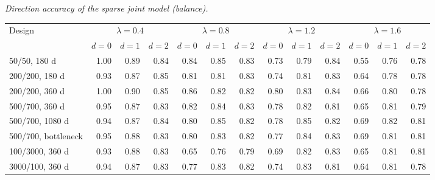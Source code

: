 \noindent\textit{Direction accuracy of the sparse joint model (balance).}
\begin{center}
\footnotesize
\setlength{\tabcolsep}{3pt}
\begin{tabular}{l*{12}{r}}
\toprule
Design & \multicolumn{3}{c}{$\lambda=0.4$} & \multicolumn{3}{c}{$\lambda=0.8$} & \multicolumn{3}{c}{$\lambda=1.2$} & \multicolumn{3}{c}{$\lambda=1.6$} \\
\cmidrule(lr){2-4}\cmidrule(lr){5-7}\cmidrule(lr){8-10}\cmidrule(lr){11-13}
 & $d=0$ & $d=1$ & $d=2$ & $d=0$ & $d=1$ & $d=2$ & $d=0$ & $d=1$ & $d=2$ & $d=0$ & $d=1$ & $d=2$ \\
\midrule
50/50, 180 d & 1.00 & 0.89 & 0.84 & 0.84 & 0.85 & 0.83 & 0.73 & 0.79 & 0.84 & 0.55 & 0.76 & 0.78 \\
200/200, 180 d & 0.93 & 0.87 & 0.85 & 0.81 & 0.81 & 0.83 & 0.74 & 0.81 & 0.83 & 0.64 & 0.78 & 0.78 \\
200/200, 360 d & 1.00 & 0.90 & 0.85 & 0.86 & 0.82 & 0.82 & 0.80 & 0.83 & 0.84 & 0.66 & 0.80 & 0.78 \\
500/700, 360 d & 0.95 & 0.87 & 0.83 & 0.82 & 0.84 & 0.83 & 0.78 & 0.82 & 0.81 & 0.65 & 0.81 & 0.79 \\
500/700, 1080 d & 0.94 & 0.87 & 0.84 & 0.80 & 0.85 & 0.82 & 0.78 & 0.85 & 0.82 & 0.69 & 0.82 & 0.81 \\
500/700, bottleneck & 0.95 & 0.88 & 0.83 & 0.80 & 0.83 & 0.82 & 0.77 & 0.84 & 0.83 & 0.69 & 0.81 & 0.81 \\
100/3000, 360 d & 0.93 & 0.88 & 0.83 & 0.65 & 0.76 & 0.79 & 0.69 & 0.82 & 0.83 & 0.65 & 0.81 & 0.81 \\
3000/100, 360 d & 0.94 & 0.87 & 0.83 & 0.77 & 0.83 & 0.82 & 0.74 & 0.83 & 0.81 & 0.64 & 0.81 & 0.78 \\
\bottomrule
\end{tabular}
\end{center}
